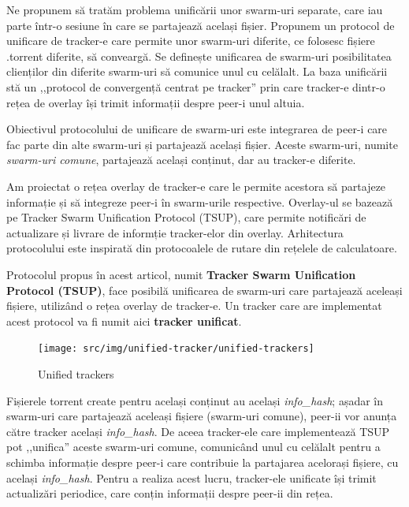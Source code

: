 Ne propunem să tratăm problema unificării unor swarm-uri separate, care iau
parte într-o sesiune în care se partajează același fișier. Propunem un
protocol de unificare de tracker-e care permite unor swarm-uri diferite, ce
folosesc fișiere .torrent diferite, să conveargă. Se definește unificarea de
swarm-uri posibilitatea clienților din diferite swarm-uri să comunice unul cu
celălalt. La baza unificării stă un ,,protocol de convergență centrat pe
tracker'' prin care tracker-e dintr-o rețea de overlay își trimit informații despre peer-i unul altuia.

Obiectivul protocolului de unificare de swarm-uri este integrarea de peer-i care fac parte din alte swarm-uri și partajează același fișier. Aceste swarm-uri, numite \textit{swarm-uri comune}, partajează același conținut, dar au tracker-e diferite.

Am proiectat o rețea overlay de tracker-e care le permite acestora să partajeze informație și să integreze peer-i în swarm-urile respective. Overlay-ul se bazează pe Tracker Swarm Unification Protocol (TSUP), care permite notificări de actualizare și livrare de informție tracker-elor din overlay. Arhitectura protocolului este inspirată din protocoalele de rutare din rețelele de calculatoare.

Protocolul propus în acest articol, numit \textbf{Tracker Swarm Unification Protocol (TSUP)}, face posibilă unificarea de swarm-uri care partajează aceleași fișiere, utilizând o rețea overlay de tracker-e. Un tracker care are implementat acest protocol va fi numit aici \textbf{tracker unificat}.

\begin{figure}[h]
  \begin{center}
    \texttt{[image: src/img/unified-tracker/unified-trackers]}
  \end{center}
  \caption{Unified trackers}
  \label{fig:unified-tracker:unified-trackers}
\end{figure}

Fișierele torrent create pentru același conținut au același
\textit{info_hash}; așadar în swarm-uri care partajează aceleași fișiere
(swarm-uri comune), peer-ii vor anunța către tracker același
\textit{info_hash}. De aceea tracker-ele care implementează TSUP pot ,,unifica'' aceste swarm-uri comune, comunicând unul cu celălalt pentru a schimba informație despre peer-i care contribuie la partajarea acelorași fișiere, cu același \textit{info_hash}. Pentru a realiza acest lucru, tracker-ele unificate își trimit actualizări periodice, care conțin informații despre peer-ii din rețea.

